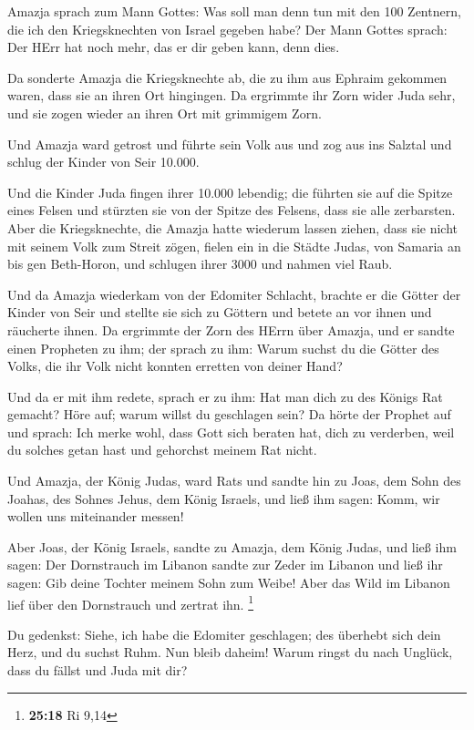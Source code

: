  Amazja sprach zum Mann Gottes: Was soll man denn tun mit
den 100 Zentnern, die ich den Kriegsknechten von Israel gegeben habe?
Der Mann Gottes sprach: Der HErr hat noch mehr, das er dir geben kann,
denn dies.

 Da sonderte Amazja die Kriegsknechte ab, die zu ihm aus
Ephraim gekommen waren, dass sie an ihren Ort hingingen. Da ergrimmte
ihr Zorn wider Juda sehr, und sie zogen wieder an ihren Ort mit
grimmigem Zorn.

 Und Amazja ward getrost und führte sein Volk aus und zog
aus ins Salztal und schlug der Kinder von Seir 10.000.

 Und die Kinder Juda fingen ihrer 10.000 lebendig; die
führten sie auf die Spitze eines Felsen und stürzten sie von der Spitze
des Felsens, dass sie alle zerbarsten.  Aber die
Kriegsknechte, die Amazja hatte wiederum lassen ziehen, dass sie nicht
mit seinem Volk zum Streit zögen, fielen ein in die Städte Judas, von
Samaria an bis gen Beth-Horon, und schlugen ihrer 3000 und nahmen viel
Raub.

 Und da Amazja wiederkam von der Edomiter Schlacht, brachte
er die Götter der Kinder von Seir und stellte sie sich zu Göttern und
betete an vor ihnen und räucherte ihnen.  Da ergrimmte der
Zorn des HErrn über Amazja, und er sandte einen Propheten zu ihm; der
sprach zu ihm: Warum suchst du die Götter des Volks, die ihr Volk nicht
konnten erretten von deiner Hand?

 Und da er mit ihm redete, sprach er zu ihm: Hat man dich
zu des Königs Rat gemacht? Höre auf; warum willst du geschlagen sein? Da
hörte der Prophet auf und sprach: Ich merke wohl, dass Gott sich beraten
hat, dich zu verderben, weil du solches getan hast und gehorchst meinem
Rat nicht.

 Und Amazja, der König Judas, ward Rats und sandte hin zu
Joas, dem Sohn des Joahas, des Sohnes Jehus, dem König Israels, und ließ
ihm sagen: Komm, wir wollen uns miteinander messen!

 Aber Joas, der König Israels, sandte zu Amazja, dem König
Judas, und ließ ihm sagen: Der Dornstrauch im Libanon sandte zur Zeder
im Libanon und ließ ihr sagen: Gib deine Tochter meinem Sohn zum Weibe!
Aber das Wild im Libanon lief über den Dornstrauch und zertrat ihn.
\footnote{\textbf{25:18} Ri 9,14}

 Du gedenkst: Siehe, ich habe die Edomiter geschlagen; des
überhebt sich dein Herz, und du suchst Ruhm. Nun bleib daheim! Warum
ringst du nach Unglück, dass du fällst und Juda mit dir?

